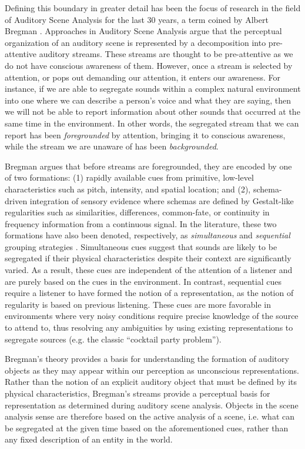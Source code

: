 \documentclass[a4paper,11pt,final]{ThesisStyle}
\begin{document}
Defining this boundary in greater detail has been the focus of research in the field of Auditory Scene Analysis for the last 30 years, a term coined by Albert Bregman \cite{Bregman1990}.  Approaches in Auditory Scene Analysis argue that the perceptual organization of an auditory scene is represented by a decomposition into pre-attentive auditory streams.  These streams are thought to be pre-attentive as we do not have conscious awareness of them.  However, once a stream is selected by attention, or pops out demanding our attention, it enters our awareness.  For instance, if we are able to segregate sounds within a complex natural environment into one where we can describe a person's voice and what they are saying, then we will not be able to report information about other sounds that occurred at the same time in the environment.  In other words, the segregated stream that we can report has been \textit{foregrounded} by attention, bringing it to conscious awareness, while the stream we are unaware of has been \textit{backgrounded}.  

Bregman argues that before streams are foregrounded, they are encoded by one of two formations: (1) rapidly available cues from primitive, low-level characteristics such as pitch, intensity, and spatial location; and (2), schema-driven integration of sensory evidence where schemas are defined by Gestalt-like regularities such as similarities, differences, common-fate, or continuity in frequency information from a continuous signal.  In the literature, these two formations have also been denoted, respectively, as \textit{simultaneous} and \textit{sequential} grouping strategies \cite{Winkler2009a}.  Simultaneous cues suggest that sounds are likely to be segregated if their physical characteristics despite their context are significantly varied.  As a result, these cues are independent of the attention of a listener and are purely based on the cues in the environment.  In contrast, sequential cues require a listener to have formed the notion of a representation, as the notion of regularity is based on previous listening.  These cues are more favorable in environments where very noisy conditions require precise knowledge of the source to attend to, thus resolving any ambiguities by using existing representations to segregate sources (e.g. the classic ``cocktail party problem'').  

Bregman's theory provides a basis for understanding the formation of auditory objects as they may appear within our perception as unconscious representations.  Rather than the notion of an explicit auditory object that must be defined by its physical characteristics, Bregman's streams provide a perceptual basis for representation as determined during auditory scene analysis.  Objects in the scene analysis sense are therefore based on the active analysis of a scene, i.e. what can be segregated at the given time based on the aforementioned cues, rather than any fixed description of an entity in the world.  
\end{document}
